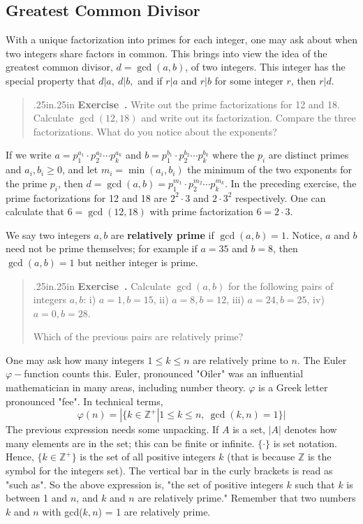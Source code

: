 \documentclass[12 pt]{article}
\newcounter{exercise}[section]
\newenvironment{exercise}{\refstepcounter{exercise}\par\bigskip \begin{quotation}{}{\leftmargin .25in\rightmargin .25in}
	\noindent \textbf{Exercise~\thesection.\theexercise }  \rmfamily}{\end{quotation}\par\bigskip}
\begin{document}
\subsection{Greatest Common Divisor}

With a unique factorization into primes for each integer, one may ask about when two integers share factors in common. This brings into view the idea of the greatest common divisor, $d = \gcd(a,b)$, of two integers.  This integer has the special property that $d|a,\ d|b,$ and if $r|a$ and $r|b$ for some integer $r$, then $r|d$.  

\begin{exercise}
Write out the prime factorizations for 12 and 18.  Calculate $\gcd(12,18)$ and write out its factorization.  Compare the three factorizations.  What do you notice about the exponents?
\end{exercise}

If we write $a = p_1^{a_1}\cdot p_2^{a_2} \cdots p_k^{a_k}$ and $b = p_1^{b_1} \cdot p_2^{b_2} \cdots p_k^{b_k}$ where the $p_i$ are distinct primes and $a_i,b_i \geq 0$, and let $m_i = \min(a_i,b_i)$ the minimum of the two exponents for the prime $p_i$, then $d = \gcd(a,b) = p_1^{m_1}\cdot p_2^{m_2} \cdots p_k^{m_k}$.  In the preceding exercise, the prime factorizations for 12 and 18 are $2^2\cdot 3$ and $2 \cdot 3^2$ respectively.  One can calculate that $6 = \gcd(12,18)$ with prime factorization $6 = 2 \cdot 3$.

We say two integers $a,b$ are \textbf{relatively prime} if $\gcd(a,b) = 1$.  Notice, $a$ and $b$ need not be prime themselves; for example if $a = 35$ and $b = 8$, then $\gcd(a,b) = 1$ but neither integer is prime.

\begin{exercise}
Calculate $\gcd(a,b)$ for the following pairs of integers $a,b$: i) $a=1, b= 15$, ii) $a = 8, b = 12$, iii) $a = 24, b = 25$, iv) $a = 0, b = 28$. 

Which of the previous pairs are relatively prime?
\end{exercise}

One may ask how many integers $1 \leq k \leq n$ are relatively prime to $n$.  The Euler $\varphi-$function counts this. Euler, pronounced "Oiler" was an influential mathematician in many areas, including number theory.
$\varphi$ is a Greek letter pronounced "fee". In technical terms, $$\varphi(n) = |\{k \in \mathbb{Z}^+| 1 \leq k \leq n,\ \gcd(k,n)=1\}|$$
The previous expression needs some unpacking.  If $A$ is a set, $|A|$ denotes how many elements are in the set; this can be finite or infinite. $\{\cdot\}$ is set notation. Hence, $\{ k \in \mathbb{Z}^+\}$ is the set of all positive integers $k$ (that is because $\mathbb{Z}$ is the symbol for the integers set). The vertical bar in the curly brackets is read as "such as". So the above expression is, "the set of positive integers $k$ such that $k$ is between 1 and $n$, and $k$ and $n$ are relatively prime." Remember that two numbers $k$ and $n$ with gcd($k,n$) = 1 are relatively prime.
\end{document}
